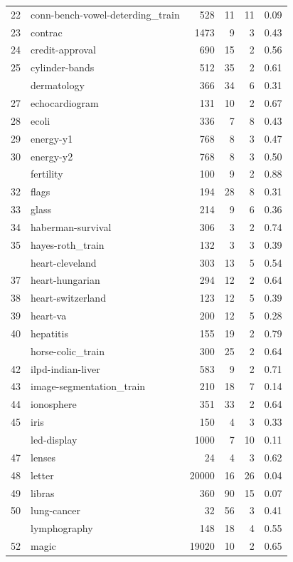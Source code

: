 \documentclass[]{elsarticle} %
\begin{document}
\begin{longtable}[t]{rlrrrr}
22 & conn-bench-vowel-deterding\_train & 528 & 11 & 11 & 0.09\\
23 & contrac & 1473 & 9 & 3 & 0.43\\
24 & credit-approval & 690 & 15 & 2 & 0.56\\
25 & cylinder-bands & 512 & 35 & 2 & 0.61\\
\addlinespace
26 & dermatology & 366 & 34 & 6 & 0.31\\
27 & echocardiogram & 131 & 10 & 2 & 0.67\\
28 & ecoli & 336 & 7 & 8 & 0.43\\
29 & energy-y1 & 768 & 8 & 3 & 0.47\\
30 & energy-y2 & 768 & 8 & 3 & 0.50\\
\addlinespace
31 & fertility & 100 & 9 & 2 & 0.88\\
32 & flags & 194 & 28 & 8 & 0.31\\
33 & glass & 214 & 9 & 6 & 0.36\\
34 & haberman-survival & 306 & 3 & 2 & 0.74\\
35 & hayes-roth\_train & 132 & 3 & 3 & 0.39\\
\addlinespace
36 & heart-cleveland & 303 & 13 & 5 & 0.54\\
37 & heart-hungarian & 294 & 12 & 2 & 0.64\\
38 & heart-switzerland & 123 & 12 & 5 & 0.39\\
39 & heart-va & 200 & 12 & 5 & 0.28\\
40 & hepatitis & 155 & 19 & 2 & 0.79\\
\addlinespace
41 & horse-colic\_train & 300 & 25 & 2 & 0.64\\
42 & ilpd-indian-liver & 583 & 9 & 2 & 0.71\\
43 & image-segmentation\_train & 210 & 18 & 7 & 0.14\\
44 & ionosphere & 351 & 33 & 2 & 0.64\\
45 & iris & 150 & 4 & 3 & 0.33\\
\addlinespace
46 & led-display & 1000 & 7 & 10 & 0.11\\
47 & lenses & 24 & 4 & 3 & 0.62\\
48 & letter & 20000 & 16 & 26 & 0.04\\
49 & libras & 360 & 90 & 15 & 0.07\\
50 & lung-cancer & 32 & 56 & 3 & 0.41\\
\addlinespace
51 & lymphography & 148 & 18 & 4 & 0.55\\
52 & magic & 19020 & 10 & 2 & 0.65\\

\end{longtable}
\end{document}

